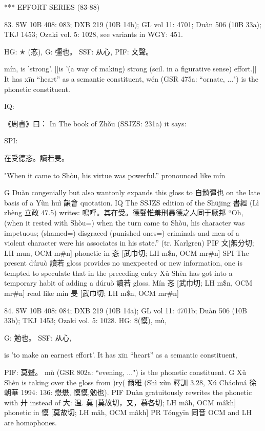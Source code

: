***
EFFORT SERIES (83-88)

83. SW 10B 408: 083; DXB 219 (10B 14b); GL vol 11: 4701; Duàn 506 (10B 33a); TKJ 1453; Ozaki vol. 5: 1028, see
variants in WGY: 451.

HG: ✭ (忞),
G:	彊也。
SSF: 从心,
PIF: 文聲。


mín,
is 'strong'. [[is '(a way of making) strong (scil. in a figurative sense) effort.]]
It has xīn ``heart'' as a semantic constituent,
wén (GSR 475a: ``ornate, ...") is the phonetic constituent.

IQ:

《周書》曰： In The book of Zhǒu (SSJZS: 231a) it says:


SPI:

在受德忞。讀若旻。

"When it came to Shòu, his virtue was powerful.'' pronounced like mín

G Duàn congenially but also wantonly expands this gloss to 自勉彊也 on the late basis of a Yùn huì 韻會 quotation.
IQ The SSJZS edition of the Shūjīng 書經 (Lì zhèng 立政 47.5) writes: 鳴呼。其在受。德䯭惟羞刑暴德之人同于厥邦 ``Oh, (when it rested with Shòu=) when the turn came to Shòu, his character was impetuous; (shamed=) disgraced (punished ones=) criminals and men of a violent character were his associates in his state.'' (tr. Karlgren)
PIF   文[無分切; LH mun, OCM m\#n] phonetic in 忞 [武巾切; LH m\$n, OCM mr\#n]
SPI The present dúruò 讀若 gloss provides no unexpected or new information, one is tempted to speculate that in the preceding entry Xǔ Shèn has got into a temporary habit of adding a dúruò 讀若 gloss.
Mín 忞 [武巾切; LH m\$n, OCM mr\#n] read like mín 旻 [武巾切; LH m\$n, OCM mr\#n]

84. SW 10B 408: 084; DXB 219 (10B 14a); GL vol 11: 4701b; Duàn 506 (10B 33b); TKJ 1453; Ozaki vol. 5: 1028.
HG:  \$(慔), mù,

G:	勉也。
SSF: 从心,

is 'to make an earnest effort'.
It has xīn ``heart'' as a semantic constituent,



PIF: 莫聲。	mù (GSR 802a: ``evening, ...") is the phonetic constituent.
G	Xǔ Shèn is taking over the gloss from )ry( 爾雅 (Shì xùn 釋訓 3.28, Xú Cháohuá 徐朝華
1994: 136: 懋懋, 慔慔,勉也).
PIF     Duàn gratuitously rewrites the phonetic with 廾 instead of 大: 温.
    莫 [莫故切，又，慕各切; LH mâh, OCM mâkh] phonetic in 慔 [莫故切; LH mâh, OCM mâkh]
PR	Tóngyīn 同音 OCM and LH are homophones.

